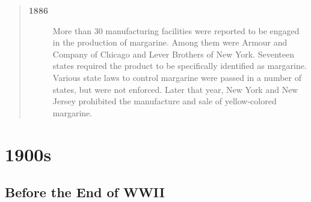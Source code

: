 \documentclass[mnsc,blindrev]{informs3}
\begin{document}
\begin{quotation}
\begin{description}
\item[\bf 1886] More than 30 manufacturing facilities were reported to
be engaged in the production of margarine. Among them were Armour
and Company of Chicago and Lever Brothers of New York. Seventeen
states required the product to be specifically identified as
margarine. Various state laws to control margarine were passed in a
number of states, but were not enforced. Later that year, New York
and New Jersey prohibited the manufacture and sale of yellow-colored
margarine.

\end{description}

\end{quotation}



\section{1900s}

\subsection{Before the End of WWII}
\end{document}
